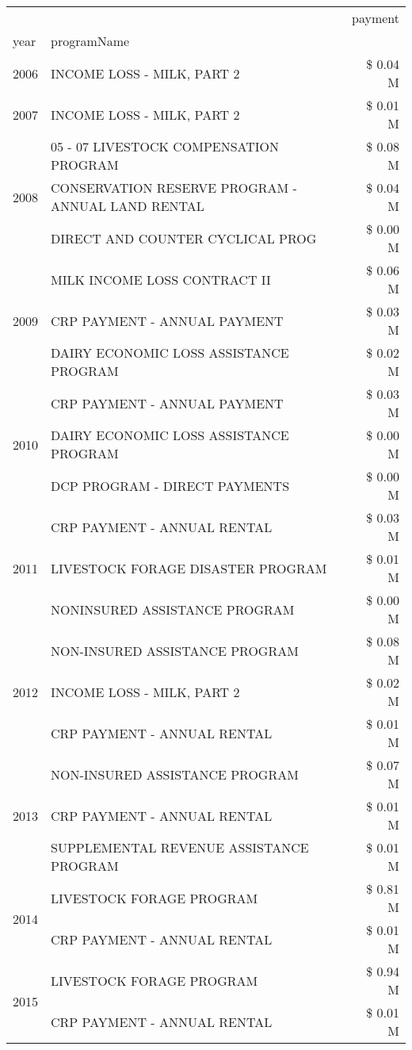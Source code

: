 \begin{tabular}{llr}
\toprule
 &  & payment \\
year & programName &  \\
\midrule
2006 & INCOME LOSS - MILK, PART 2 & \$ 0.04 M \\
\cline{1-3}
2007 & INCOME LOSS - MILK, PART 2 & \$ 0.01 M \\
\cline{1-3}
\multirow[t]{3}{*}{2008} & 05 - 07 LIVESTOCK COMPENSATION PROGRAM & \$ 0.08 M \\
 & CONSERVATION RESERVE PROGRAM - ANNUAL LAND RENTAL & \$ 0.04 M \\
 & DIRECT AND COUNTER CYCLICAL PROG & \$ 0.00 M \\
\cline{1-3}
\multirow[t]{3}{*}{2009} & MILK INCOME LOSS CONTRACT II & \$ 0.06 M \\
 & CRP PAYMENT - ANNUAL PAYMENT & \$ 0.03 M \\
 & DAIRY ECONOMIC LOSS ASSISTANCE PROGRAM & \$ 0.02 M \\
\cline{1-3}
\multirow[t]{3}{*}{2010} & CRP PAYMENT - ANNUAL PAYMENT & \$ 0.03 M \\
 & DAIRY ECONOMIC LOSS ASSISTANCE PROGRAM & \$ 0.00 M \\
 & DCP PROGRAM - DIRECT PAYMENTS & \$ 0.00 M \\
\cline{1-3}
\multirow[t]{3}{*}{2011} & CRP PAYMENT - ANNUAL RENTAL & \$ 0.03 M \\
 & LIVESTOCK FORAGE DISASTER PROGRAM & \$ 0.01 M \\
 & NONINSURED ASSISTANCE PROGRAM & \$ 0.00 M \\
\cline{1-3}
\multirow[t]{3}{*}{2012} & NON-INSURED ASSISTANCE PROGRAM & \$ 0.08 M \\
 & INCOME LOSS - MILK, PART 2 & \$ 0.02 M \\
 & CRP PAYMENT - ANNUAL RENTAL & \$ 0.01 M \\
\cline{1-3}
\multirow[t]{3}{*}{2013} & NON-INSURED ASSISTANCE PROGRAM & \$ 0.07 M \\
 & CRP PAYMENT - ANNUAL RENTAL & \$ 0.01 M \\
 & SUPPLEMENTAL REVENUE ASSISTANCE PROGRAM & \$ 0.01 M \\
\cline{1-3}
\multirow[t]{2}{*}{2014} & LIVESTOCK FORAGE PROGRAM & \$ 0.81 M \\
 & CRP PAYMENT - ANNUAL RENTAL & \$ 0.01 M \\
\cline{1-3}
\multirow[t]{3}{*}{2015} & LIVESTOCK FORAGE PROGRAM & \$ 0.94 M \\
 & CRP PAYMENT - ANNUAL RENTAL & \$ 0.01 M \\

\end{tabular}
